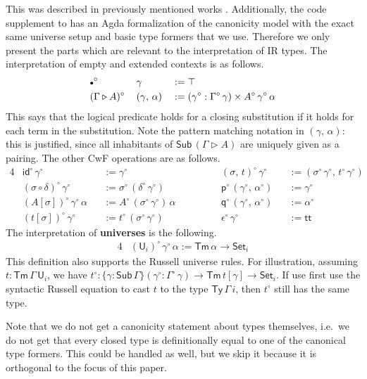\documentclass[acmsmall,screen,review]{acmart}
\newcommand{\msf}[1]{{\mathsf{#1}}}
\newcommand{\p}{\mathsf{p}}
\newcommand{\q}{\mathsf{q}}
\newcommand{\U}{\msf{U}}
\newcommand{\Set}{\msf{Set}}
\newcommand{\ttt}{\msf{tt}}
\newcommand{\emptycon}{\scaleobj{.75}\bullet}
\newcommand{\id}{\msf{id}}
\newcommand{\Sub}{\msf{Sub}}
\newcommand{\Ty}{\msf{Ty}}
\newcommand{\Tm}{\msf{Tm}}
\newcommand{\ext}{\triangleright}
\newcommand{\w}{\circ}
\begin{document}
This was described in previously mentioned works \cite{gluing,coquand2018canonicity}. Additionally,
the code supplement \cite{formalisation} to \cite{DBLP:conf/mpc/KaposiKK19} has an Agda
formalization of the canonicity model with the exact same universe setup and basic type formers that
we use. Therefore we only present the parts which are relevant to the interpretation of IR
types. The interpretation of empty and extended contexts is as follows.
\begin{alignat*}{3}
  &\emptycon^\w\,&&\gamma                 &&:= \top \\
  &(\Gamma\ext A)^\w\,&&(\gamma,\,\alpha) &&:= (\gamma^\w : \Gamma^\w\,\gamma) \times A^\w\,\gamma^\w\,\alpha
\end{alignat*}
This says that the logical predicate holds for a closing substitution if it holds for each term in
the substitution. Note the pattern matching notation in $(\gamma,\,\alpha)$: this is justified,
since all inhabitants of $\Sub\,(\Gamma\ext A)$ are uniquely given as a pairing. The other CwF operations
are as follows.
\begin{alignat*}{4}
  &\id^\w\,\gamma^\w                   &&:= \gamma^\w                  &&(\sigma,\,t)^\w\,\gamma^\w          &&:= (\sigma^\w\,\gamma^\w,\,t^\w\,\gamma^\w)\\
  &(\sigma \circ \delta)^\w\,\gamma^\w &&:= \sigma^\w\,(\delta^\w\,\gamma^\w) && \p^\w\,(\gamma^\w,\,\alpha^\w)      &&:= \gamma^\w\\
  &(A[\sigma]) ^\w\,\gamma^\w\,\alpha  &&:= A^\w\,(\sigma^\w\,\gamma^\w)\,\alpha\hspace{3em} && \q^\w\,(\gamma^\w,\,\alpha^\w)      &&:= \alpha^\w\\
  &(t[\sigma]) ^\w\,\gamma^\w          &&:= t^\w\,(\sigma^\w\,\gamma^\w) && \epsilon^\w\,\gamma^\w              &&:= \ttt
\end{alignat*}
The interpretation of \textbf{universes} is the following.
\begin{alignat*}{4}
  &(\U_i)^\w\,\gamma^\w\,\alpha := \Tm\,\alpha \to \Set_i
\end{alignat*}
This definition also supports the Russell universe rules. For illustration, assuming $t :
\Tm\,\Gamma\,\U_i$, we have $t^\w : \{\gamma : \Sub\,\Gamma\}(\gamma^\w : \Gamma^\w\,\gamma) \to
\Tm\,t[\gamma] \to \Set_i$. If use first use the syntactic Russell equation to cast $t$ to the type
$\Ty\,\Gamma\,i$, then $t^\w$ still has the same type.

Note that we do not get a canonicity statement about types themselves, i.e.\ we do not get that
every closed type is definitionally equal to one of the canonical type formers. This could be handled
as well, but we skip it because it is orthogonal to the focus of this paper.
\end{document}
